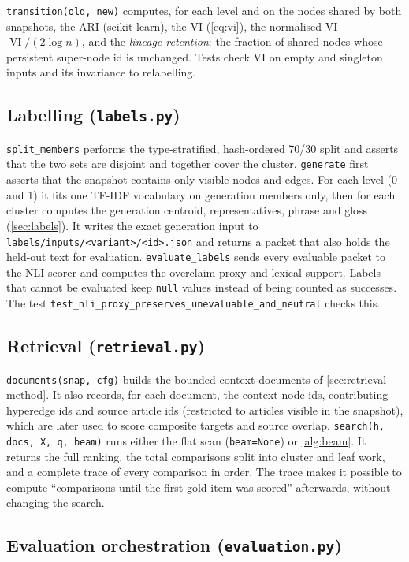 \documentclass[11pt,a4paper]{article}
\newcommand{\cref}[1]{\autoref{#1}}
\theoremstyle{remark}
\newcommand{\code}[1]{\texttt{\small #1}}
\newcommand{\VI}{\operatorname{VI}}
\begin{document}
\code{transition(old, new)} computes, for each level and on the nodes shared by both
snapshots, the ARI (scikit-learn), the VI (\cref{eq:vi}), the normalised VI
$\VI/(2\log n)$, and the \emph{lineage retention}: the fraction of shared nodes whose
persistent super-node id is unchanged. Tests check VI on empty and singleton inputs and its
invariance to relabelling.

\subsection{Labelling (\code{labels.py})}

\code{split\_members} performs the type-stratified, hash-ordered 70/30 split and asserts
that the two sets are disjoint and together cover the cluster. \code{generate} first asserts
that the snapshot contains only visible nodes and edges. For each level (0 and 1) it fits one
TF-IDF vocabulary on generation members only, then for each cluster computes the generation
centroid, representatives, phrase and gloss (\cref{sec:labels}). It writes the exact
generation input to \code{labels/inputs/<variant>/<id>.json} and returns a packet that also
holds the held-out text for evaluation. \code{evaluate\_labels} sends every evaluable packet to
the NLI scorer and computes the overclaim proxy and lexical support. Labels that cannot be
evaluated keep \code{null} values instead of being counted as successes. The test
\code{test\_nli\_proxy\_preserves\_unevaluable\_and\_neutral} checks this.

\subsection{Retrieval (\code{retrieval.py})}

\code{documents(snap, cfg)} builds the bounded context documents of
\cref{sec:retrieval-method}. It also records, for each document, the context node ids,
contributing hyperedge ids and source article ids (restricted to articles visible in the
snapshot), which are later used to score composite targets and source overlap.
\code{search(h, docs, X, q, beam)} runs either the flat scan (\code{beam=None}) or
\cref{alg:beam}. It returns the full ranking, the total comparisons split into cluster and
leaf work, and a complete trace of every comparison in order. The trace makes it possible to
compute ``comparisons until the first gold item was scored'' afterwards, without changing
the search.

\subsection{Evaluation orchestration (\code{evaluation.py})}
\end{document}
